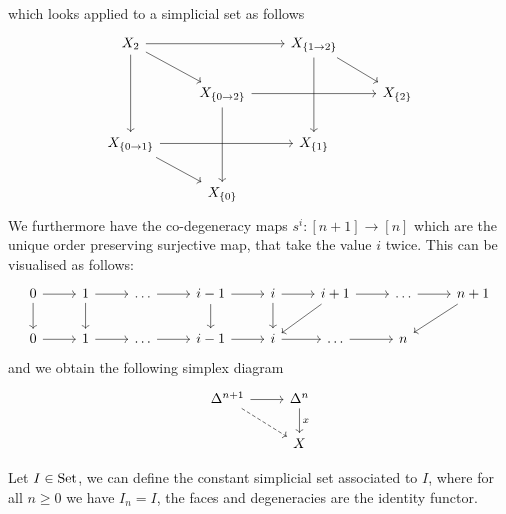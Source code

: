 which looks applied to a simplicial set as follows
\[
\begin{tikzcd}
    X_2
    \ar[rr]
    \ar[rd]
    \ar[dd]
    &
    &
    X_{\{1 \to 2 \}}
    \ar[rd]
    \ar[dd]
    \\
    &
    X_{\{ 0 \to 2\}}
    \ar[dd]
    \ar[rr]
    &&
    X_{\{2\}}
    \\
    X_{\{0 \to 1 \}}
    \ar[rr]
    \ar[rd]
    &&
    X_{\{1\}}
    \\
    &
    X_{ \{ 0 \} }
\end{tikzcd}
\]
We furthermore have the co-degeneracy maps $ s^i \colon [ n + 1 ] \to [ n ] $ which are the unique order preserving surjective map, that take the value $ i $ twice.
This can be visualised as follows:
\[
\begin{tikzcd}
    0
    \ar[r]
    \ar[d]
    &
    1
    \ar[r]
    \ar[d]
    &
    \dots
    \ar[r]
    &
    i-1
    \ar[d]
    \ar[r]
    &
    i
    \ar[d]
    \ar[r]
    &
    i+1
    \ar[dl]
    \ar[r]
    &
    \dots
    \ar[r]
    &
    n+1
    \ar[dl]
    \\
    0
    \ar[r]
    &
    1
    \ar[r]
    &
    \dots
    \ar[r]
    &
    i-1
    \ar[r]
    &
    i
    \ar[r]
    &
    \dots
    \ar[r]
    &
    n
\end{tikzcd}
\]
and we obtain the following simplex diagram
\[
\begin{tikzcd}
    \Delta^{n+1}
    \ar[r]
    \ar[rd, dashed]
    &
    \Delta^n
    \ar[d, "x"]
    \\
    &
    X
\end{tikzcd}
\]

\begin{exmp}
    Let $ I \in \operatorname{Set} $, we can define the constant simplicial set associated to $ I $, where for all $ n \geq 0 $ we have $ I_n = I $, the faces and degeneracies are the identity functor.    
\end{exmp}

